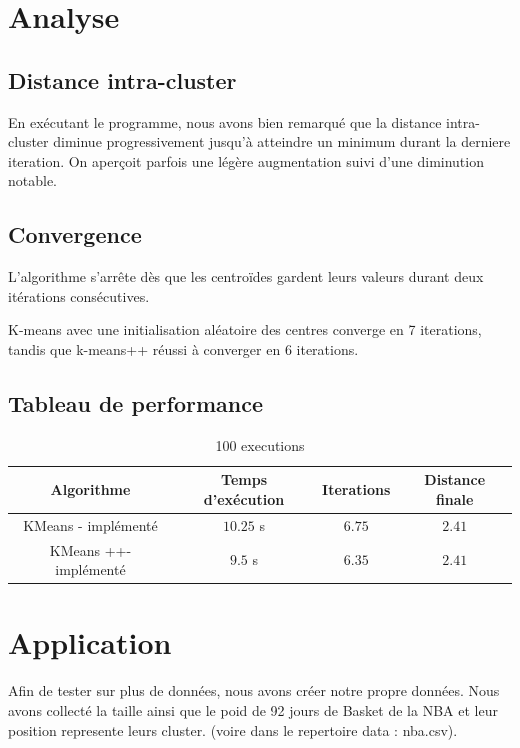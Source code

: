 \documentclass[french]{article}
\begin{document}
\newpage
\section{Analyse}
\subsection{Distance intra-cluster}
En exécutant le programme, nous avons bien remarqué que la distance intra-cluster diminue progressivement jusqu'à atteindre un minimum durant la derniere iteration. On aperçoit parfois une légère augmentation suivi d’une diminution notable.\\

\subsection{Convergence}
L’algorithme s'arrête dès que les centroïdes gardent leurs valeurs durant deux itérations consécutives.

K-means avec une initialisation aléatoire des centres converge en 7 iterations, tandis que k-means++ réussi à converger en 6 iterations.

\subsection{Tableau de performance}

    \begin{table}[!hbt]
        \begin{center}
        \caption{ 100 executions }
        \label{tab:simParameters}
        \begin{tabular}{|c|c|c|c|}
            \hline
           Algorithme & Temps d'exécution & Iterations  & Distance finale \\
            \hline
           KMeans - implémenté & $10.25$ s & $6.75$ & $2.41$ \\
            \hline
           KMeans ++- implémenté & $9.5$ s & $6.35$ & $2.41$  \\
            \hline      
        \end{tabular}
        \end{center}
    \end{table}

\section{Application}
Afin de tester sur plus de données, nous avons créer notre propre données. Nous avons collecté la taille ainsi que le poid de 92 jours de Basket de la NBA et leur position represente leurs cluster. (voire dans le repertoire data : nba.csv).
\end{document}
